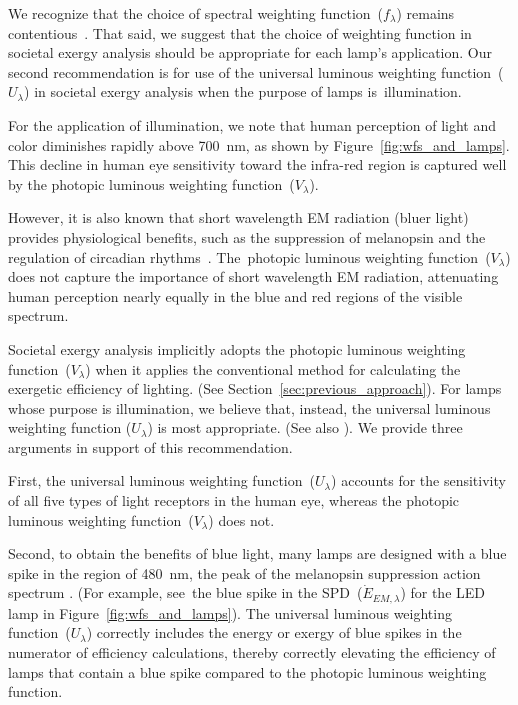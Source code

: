 \documentclass[energies,article,accept,moreauthors,pdftex]{Definitions/mdpi}\usepackage[]{graphicx}\usepackage[]{color}
\newcommand{\del}[1]{}
\providecommand{\DIFdelbegin}{} %
\providecommand{\DIFdelend}{} %
\newcommand{\DIFscaledelfig}{0.5}
\newlength{\DIFdelgraphicswidth} %
\newlength{\DIFdelgraphicsheight} %
\newcommand{\DIFdelincludegraphics}[2][]{%
\sbox{\DIFdelgraphicsbox}{\DIFOincludegraphics[#1]{#2}}%
\settoboxwidth{\DIFdelgraphicswidth}{\DIFdelgraphicsbox} %
\settoboxtotalheight{\DIFdelgraphicsheight}{\DIFdelgraphicsbox} %
\scalebox{\DIFscaledelfig}{%
\parbox[b]{\DIFdelgraphicswidth}{\usebox{\DIFdelgraphicsbox}\\[-\baselineskip] \rule{\DIFdelgraphicswidth}{0em}}\llap{\resizebox{\DIFdelgraphicswidth}{\DIFdelgraphicsheight}{%
\setlength{\unitlength}{\DIFdelgraphicswidth}%
\begin{picture}(1,1)%
\thicklines\linethickness{2pt} %
{\color[rgb]{1,0,0}\put(0,0){\framebox(1,1){}}}%
{\color[rgb]{1,0,0}\put(0,0){\line( 1,1){1}}}%
{\color[rgb]{1,0,0}\put(0,1){\line(1,-1){1}}}%
\end{picture}%
}\hspace*{3pt}}} %
} %
\DeclareRobustCommand{\DIFdelbegin}{\DIFOdelbegin \let\includegraphics\DIFdelincludegraphics} %
\DeclareRobustCommand{\DIFdelend}{\DIFOaddend \let\includegraphics\DIFOincludegraphics} %
\begin{document}
We recognize that the choice of spectral weighting function~($f_\lambda$)
remains contentious~\cite{Delgado-Bonal:2017aa, Pattison2018LEDphotons, Rea2018, Royer2016}.
That said, we suggest that the choice of weighting function \DIFdelbegin %
\DIFdelend in societal exergy analysis
should be appropriate for each lamp's application.
Our second recommendation is for use of
the universal luminous weighting function~($U_\lambda$) in societal exergy analysis
when the purpose of lamps \mbox{is illumination}.

For the application of illumination, 
we note that human perception of light and color diminishes rapidly above 700~nm,
as shown by Figure~\ref{fig:wfs_and_lamps}.
This decline in human eye sensitivity toward the infra-red region
is captured well by the photopic luminous weighting function~($V_\lambda$).

However, it is also known that short wavelength EM radiation (bluer light)
provides physiological benefits, such as
the suppression of melanopsin and 
the regulation of circadian rhythms~\citep{Pattison2018LEDphotons}.
\mbox{The photopic} luminous weighting function~($V_\lambda$) does not
capture the importance of short wavelength EM radiation, 
attenuating human perception nearly equally in the blue and red regions
of the visible spectrum.

Societal exergy analysis implicitly adopts the photopic luminous weighting function~($V_\lambda$)
when it applies the conventional method for calculating the exergetic efficiency of lighting.
(See Section~\ref{sec:previous_approach}).
For lamps whose purpose is illumination, 
we believe that, instead, the universal luminous weighting function ($U_\lambda$)
is most appropriate.
(See also \citet{Rea2018}).
We provide three arguments in support of this recommendation.

First, 
the universal luminous weighting function~($U_\lambda$)
accounts for the sensitivity of all five types of light receptors in the human eye,
whereas the photopic luminous weighting function~($V_\lambda$) does not.

Second,
to obtain the benefits of blue light, 
many lamps are designed with a blue spike 
in the region of 480~nm, 
the peak of the melanopsin suppression action spectrum \cite{lucas2014}.
(For example, \mbox{see the} blue spike in the SPD~($\dot{E}_{EM,\lambda}$)
for the LED lamp in Figure~\ref{fig:wfs_and_lamps}).
The universal luminous weighting function~($U_\lambda$)
correctly includes the energy or exergy of blue spikes
in the numerator of efficiency calculations,
thereby correctly elevating the efficiency of lamps that contain a blue spike
compared to the photopic luminous weighting function.
\end{document}

